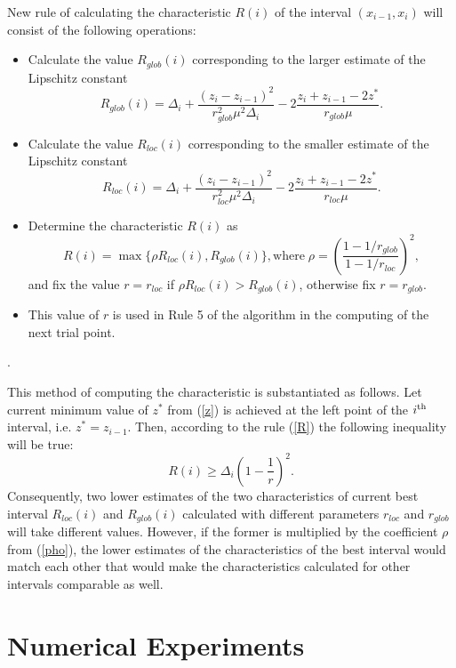 \documentclass[runningheads]{llncs}
\begin{document}
New rule of calculating the characteristic $R(i)$ of the interval $(x_{i-1}, x_i)$ will consist of the following operations:
\begin{itemize}
\item
Calculate the value $R_{glob}(i)$ corresponding to the larger estimate of the Lipschitz constant
\[
R_{glob}(i)=\Delta_i+\frac{(z_i-z_{i-1})^2}{r_{glob}^2\mu^2\Delta_i}-2\frac{z_i+z_{i-1}-2z^*}{r_{glob}\mu}.
\]
\item
Calculate the value $R_{loc}(i)$ corresponding to the smaller estimate of the Lipschitz constant
\[
R_{loc}(i)=\Delta_i+\frac{(z_i-z_{i-1})^2}{r_{loc}^2\mu^2\Delta_i}-2\frac{z_i+z_{i-1}-2z^*}{r_{loc}\mu}.
\]
\item
Determine the characteristic $R(i)$ as
\begin{equation}\label{pho}
R(i) = \max\{\rho R_{loc}(i),R_{glob}(i)\}, \textrm{where} \; \rho = \left(\frac{1-1/r_{glob}}{1-1/r_{loc}}\right)^2,
\end{equation}
and fix the value $r = r_{loc}$ if $\rho R_{loc}(i) > R_{glob}(i)$, otherwise fix $r=r_{glob}$.
\item
This value of $r$ is used in Rule 5 of the algorithm in the computing of the next trial point.   
\end{itemize}.

This method of computing the characteristic is substantiated as follows. 
Let current minimum value of $z^*$ from (\ref{z}) is achieved at the left point of the $i^{\rm th}$ interval, i.e. $z^* = z_{i-1}$. Then, according to the rule (\ref{R}) the following inequality will be true: 
\[
R(i) \geq \Delta_i \left( 1 - \frac{1}{r} \right)^2.
\]
Consequently, two lower estimates of the two characteristics of current best interval $R_{loc}(i)$ and $R_{glob}(i)$ calculated with different parameters $r_{loc}$ and $r_{glob}$ will take different values.
However, if the former is multiplied by the coefficient $\rho$ from (\ref{pho}), the lower estimates of the characteristics of the best interval would match each other that would make the characteristics calculated for other intervals comparable as well.

\section{Numerical Experiments}
\end{document}
